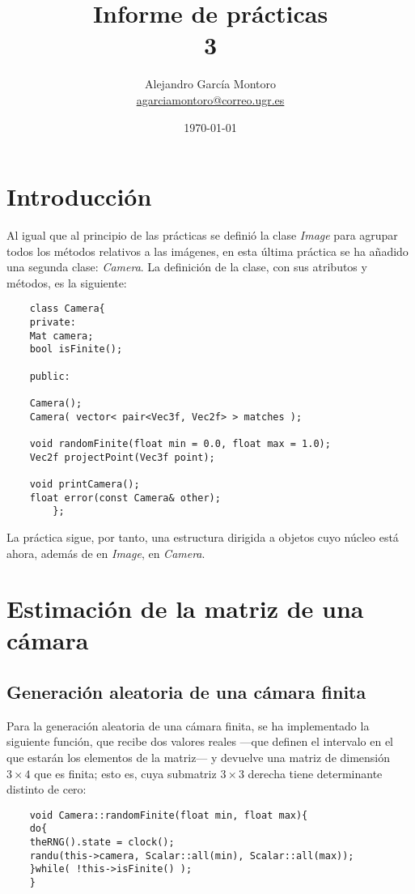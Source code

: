 \documentclass[a4paper, 11pt]{article}
\title{Informe de prácticas \\ 3}
\author{Alejandro García Montoro\\
\href{mailto:agarciamontoro@correo.ugr.es}{agarciamontoro@correo.ugr.es}}
\date{\today}
\theoremstyle{definition}
\theoremstyle{theorem}
\begin{document}
    \maketitle

    \section*{Introducción}
    Al igual que al principio de las prácticas se definió la clase \emph{Image} para agrupar todos los métodos relativos a las imágenes, en esta última práctica se ha añadido una segunda clase: \emph{Camera}. La definición de la clase, con sus atributos y métodos, es la siguiente:

    \begin{lstlisting}
    class Camera{
    private:
    Mat camera;
    bool isFinite();

    public:

    Camera();
    Camera( vector< pair<Vec3f, Vec2f> > matches );

    void randomFinite(float min = 0.0, float max = 1.0);
    Vec2f projectPoint(Vec3f point);

    void printCamera();
    float error(const Camera& other);
        };
    \end{lstlisting}

    La práctica sigue, por tanto, una estructura dirigida a objetos cuyo núcleo está ahora, además de en \emph{Image}, en \emph{Camera}.

    \section{Estimación de la matriz de una cámara}
    \subsection{Generación aleatoria de una cámara finita}

    Para la generación aleatoria de una cámara finita, se ha implementado la siguiente función, que recibe dos valores reales ---que definen el intervalo en el que estarán los elementos de la matriz--- y devuelve una matriz de dimensión $3\times4$ que es finita; esto es, cuya submatriz $3\times3$ derecha tiene determinante distinto de cero:

    \begin{lstlisting}
    void Camera::randomFinite(float min, float max){
    do{
    theRNG().state = clock();
    randu(this->camera, Scalar::all(min), Scalar::all(max));
    }while( !this->isFinite() );
    }
    \end{lstlisting}
\end{document}
